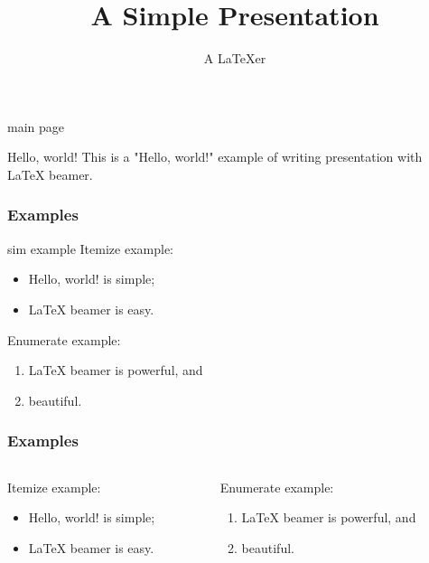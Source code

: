 \documentclass{beamer}
\begin{document}
\title{A Simple Presentation}
\author{A \LaTeX{}er}

\begin{frame}{main page}
  \titlepage
\end{frame}

\begin{frame}{Hello, world!}
  This is a "Hello, world!" example of writing presentation with \LaTeX{} beamer.
\end{frame}
\begin{frame}\frametitle{Examples}
  \begin{example}{sim example}
    Itemize example:
    \begin{itemize}
    \item Hello, world! is simple;
    \item \LaTeX{} beamer is easy.
    \end{itemize}
  \end{example}
  \begin{exampleblock}{Enumerate example:}
    \begin{enumerate}
    \item \LaTeX{} beamer is powerful, and
    \item beautiful.
    \end{enumerate}
  \end{exampleblock}
\end{frame}

\begin{frame}\frametitle{Examples}
  \begin{columns}
    \begin{column}{.5\textwidth}
      \begin{example}
        Itemize example:
        \begin{itemize}
        \item Hello, world! is simple;
        \item \LaTeX{} beamer is easy.
        \end{itemize}
      \end{example}
    \end{column}
    \begin{column}{.5\textwidth}
      \begin{exampleblock}{Enumerate example:}
        \begin{enumerate}
        \item \LaTeX{} beamer is powerful, and
        \item beautiful.
        \end{enumerate}
      \end{exampleblock}
    \end{column}
  \end{columns}
\end{frame}
\end{document}
